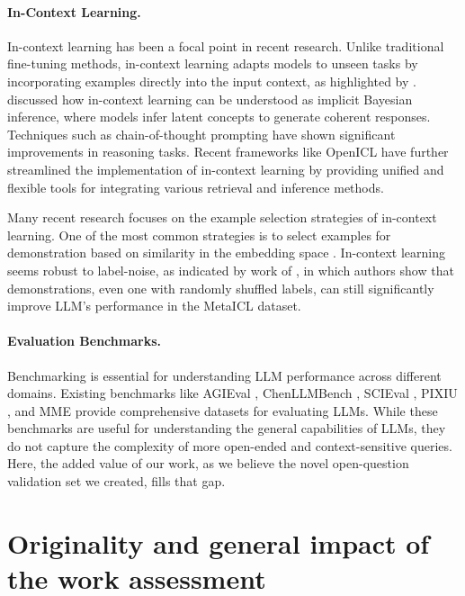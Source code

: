 \documentclass{article}
\begin{document}
    \paragraph{In-Context Learning.} In-context learning has been a focal point in recent research. Unlike tra\-ditional fine-tuning methods, in-context learning adapts models to unseen tasks by incorporating examples directly into the input context, as highlighted by \citet{brown2020language}. \citet{xie2022explanation} discussed how in-context learning can be understood as implicit Bayesian inference, where models infer latent concepts to generate coherent responses. Techniques such as chain-of-thought prompting \citep{wei2023chainofthought, press2023measuring, wang2022iteratively, zhou2023leasttomost, imani2023mathprompter, besta2023graph} have shown significant improvements in reasoning tasks. Recent frameworks like OpenICL \citep{wu2023openicl} have further streamlined the implementation of in-context learning by providing unified and flexible tools for integrating various retrieval and inference methods.

    Many recent research focuses on the example selection strategies of in-context learning. One of the most common strategies is to select examples for demonstration based on similarity in the embedding space \citep{liu2022what, qin2023in, gao2021making}. In-context learning seems robust to label-noise, as indicated by work of \citet{min2022rethinking}, in which authors show that demonstrations, even one with randomly shuffled labels, can still significantly improve LLM's performance in the MetaICL dataset. 

    \paragraph{Evaluation Benchmarks.} Benchmarking is essential for understanding LLM performance across different domains. Existing benchmarks like AGIEval \citep{zhong2023agieval}, ChenLLMBench \citep{guo2023chemllmbench}, SCIEval \citep{sun2023scieval}, PIXIU \citep{xie2023pixiu}, and MME \citep{fu2024mme} provide comprehensive datasets for evaluating LLMs. While these benchmarks are useful for understanding the general capabilities of LLMs, they do not capture the complexity of more open-ended and context-sensitive queries. Here, the added value of our work, as we believe the novel open-question validation set we created, fills that gap.

\section{Originality and general impact of the work assessment}
\end{document}
